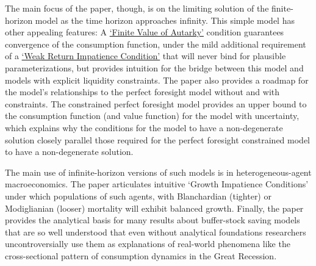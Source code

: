 \documentclass[BufferStockTheory]{subfiles}
\begin{document}
The main focus of the paper, though, is on the limiting solution of the finite-horizon model as the time horizon approaches infinity.
This simple model has other appealing features: A \hyperlink{FVAC}{`Finite Value of Autarky'} condition guarantees convergence of the consumption function, under the mild additional requirement of a \hyperlink{WRIC}{`Weak Return Impatience Condition'} that will never bind for plausible parameterizations, but provides intuition for the bridge between this model and models with explicit liquidity constraints.
The paper also provides a roadmap for the model's relationships to the perfect foresight model without and with constraints.
The constrained perfect foresight model provides an upper bound to the consumption function (and value function) for the model with uncertainty, which explains why the conditions for the model to have a non-degenerate solution closely parallel those required for the perfect foresight constrained model to have a non-degenerate solution.

The main use of infinite-horizon versions of such models is in heterogeneous-agent macroeconomics.
The paper articulates intuitive `Growth Impatience Conditions' under which populations of such agents, with Blanchardian (tighter) or Modiglianian (looser) mortality will exhibit balanced growth.
Finally, the paper provides the analytical basis for many results about buffer-stock saving models that are so well understood that even without analytical foundations researchers uncontroversially use them as explanations of real-world phenomena like the cross-sectional pattern of consumption dynamics in the Great Recession.










\ifSubfilesClassLoaded{\bibfilesfind{\texname}}{}
\end{document}
